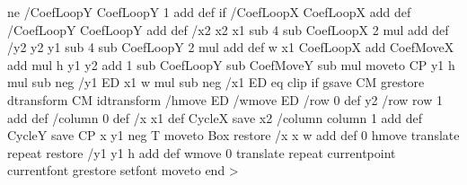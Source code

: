    \psk@fillsepy{} ne {/CoefLoopY CoefLoopY 1 add def} if
    /CoefLoopX CoefLoopX \psk@fillloopaddx\space add def
    /CoefLoopY CoefLoopY \psk@fillloopaddy\space add def
    /x2 x2 x1 sub 4 sub CoefLoopX 2 mul add def
    /y2 y2 y1 sub 4 sub CoefLoopY 2 mul add def
    w x1 CoefLoopX add CoefMoveX add mul
      h y1 y2 add 1 sub CoefLoopY sub CoefMoveY sub mul moveto
    CP 
    y1 h mul sub neg /y1 ED
    x1 w mul sub neg /x1 ED
     eq {clip} if
    \psk@fillmovex\space \psk@fillmovey
    gsave \tx@STV CM grestore 
    dtransform CM idtransform
    /hmove ED /wmove ED
    /row 0 def
    y2 {
       /row row 1 add def
       /column 0 def
       /x x1 def
       CycleX
       save
       x2 {
          /column column 1 add def
          CycleY
          save CP x y1 
          \ifPSTlualatex neg \fi
          T moveto Box restore
          /x x w add def
          0 hmove translate
          } repeat
       restore
       /y1 y1 h add def
       wmove 0 translate
    } repeat
    currentpoint 
    currentfont 
    grestore 
    setfont 
    moveto
    \ifPSTlualatex end \fi
  >
\fi %

